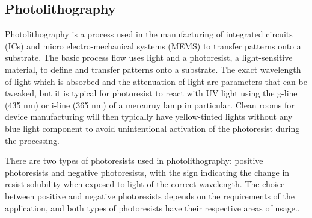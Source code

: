 \subsection{Photolithography}
Photolithography is a process used in the manufacturing of integrated circuits (ICs) and micro electro-mechanical systems (MEMS) to transfer patterns onto a substrate. The basic process flow uses light and a photoresist, a light-sensitive material, to define and transfer patterns onto a substrate. The exact wavelength of light which is absorbed and the attenuation of light are parameters that can be tweaked, but it is typical for photoresist to react with UV light using the g-line (435 \si{\nano\metre}) or i-line (365 \si{\nano\metre}) of a mercuruy lamp in particular. Clean rooms for device manufacturing will then typically have yellow-tinted lights without any blue light component to avoid unintentional activation of the photoresist during the processing.

There are two types of photoresists used in photolithography: positive photoresists and negative photoresists, with the sign indicating the change in resist solubility when exposed to light of the correct wavelength. The choice between positive and negative photoresists depends on the requirements of the application, and both types of photoresists have their respective areas of usage..

